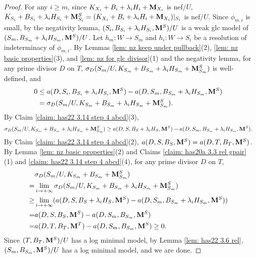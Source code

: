 \documentclass[11pt]{amsart}
\numberwithin{equation}{section}
\newcommand{\Mm}{{\bf{M}}}
\theoremstyle{definition}
\theoremstyle{definition}
\theoremstyle{definition}
\begin{document}
\begin{proof}
For any $i\geq m$, since $K_{X_i}+B_i+\lambda_iH_i+\Mm_{X_i}$ is nef$/U$, $K_{S_i}+B_{S_i}+\lambda_iH_{S_i}+\Mm^S_{S_i}=(K_{X_i}+B_i+\lambda_iH_i+\Mm_{X_i})|_{S_i}$ is nef$/U$. Since $\phi_{m,i}$ is small, by the negativity lemma, $(S_i,B_{S_i}+\lambda_iH_{S_i},\Mm^S)/U$ is a weak glc model of $(S_m,B_{S_m}+\lambda_iH_{S_m},\Mm^S)/U$. Let $h_m: W\rightarrow S_m$ and $h_i: W\rightarrow S_i$ be a resolution of indeterminacy of $\phi_{m,i}$. By Lemmas \ref{lem: nz keep under pullback}(2), \ref{lem: nz basic properties}(3), and \ref{lem: nz for glc divisor}(1) and the negativity lemma, for any prime divisor $D$ on $T$, $\sigma_D(S_m/U,K_{S_m}+B_{S_m}+\lambda_iH_{S_m}+\Mm^S_{S_m})$ is well-defined, and
\begin{align*}
    0&\leq a(D,S_i,B_{S_i}+\lambda_iH_{S_i},\Mm^S)-a(D,S_m,B_{S_m}+\lambda_iH_{S_m},\Mm^S)\\
    &=\sigma_D(S_m/U,K_{S_m}+B_{S_m}+\lambda_iH_{S_m}+\Mm^S_{S_m}).
\end{align*}
By Claim \ref{claim: has22 3.14 step 4 abcd}(3), 
$$\sigma_D(S_m/U,K_{S_m}+B_{S_m}+\lambda_iH_{S_m}+\Mm^S_{S_m})\geq  a(D,S,B_{S}+\lambda_iH_{S},\Mm^S)-a(D,S_m,B_{S_m}+\lambda_iH_{S_m},\Mm^S).$$
By Claim \ref{claim: has22 3.14 step 4 abcd}(2), $a(D,S,B_S,\Mm^S)=a(D,T,B_T,\Mm^S)$. By Lemma \ref{lem: nz basic properties}(2) and Claims \ref{claim: has20a 3.3 rel gpair}(1) and \ref{claim: has22 3.14 step 4 abcd}(4), for any prime divisor $D$ on $T$,
\begin{align*}
    &\sigma_D(S_m/U,K_{S_m}+B_{S_m}+\Mm^S_{S_m})\\
    =&\lim_{i\rightarrow+\infty}\sigma_D(S_m/U,K_{S_m}+B_{S_m}+\lambda_iH_{S_m}+\Mm^S_{S_m})\\
    \geq&\lim_{i\rightarrow+\infty}(a(D,S,B_S+\lambda_iH_S,\Mm^S)-a(D,S_m,B_{S_m}+\lambda_iH_{S_m},\Mm^S))\\
    =&a(D,S,B_S,\Mm^S)-a(D,S_m,B_{S_m},\Mm^S)\\
    =&a(D,T,B_T,\Mm^T)-a(D,S_m,B_{S_m},\Mm^S)\geq 0.
\end{align*}
Since $(T,B_T,\Mm^S)/U$ has a log minimal model, by Lemma \ref{lem: has22 3.6 rel}, $(S_m,B_{S_m},\Mm^S)/U$ has a log minimal model, and we are done.
\end{proof}
\end{document}
